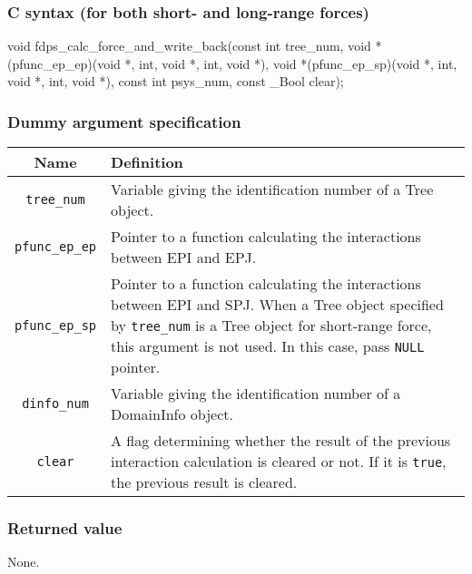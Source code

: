 \subsubsection*{C syntax (for both short- and long-range forces)}
\begin{screen}
\begin{spverbatim}
void fdps_calc_force_and_write_back(const int tree_num,                                             
                                    void *(pfunc_ep_ep)(void *, int, void *, int, void *),          
                                    void *(pfunc_ep_sp)(void *, int, void *, int, void *),          
                                    const int psys_num,                                             
                                    const _Bool clear);
\end{spverbatim}
\end{screen}

\subsubsection*{Dummy argument specification}
\begin{table}[h]
\begin{tabularx}{\linewidth}{cX}
\toprule
\rowcolor{Snow2}
Name & Definition \\
\midrule
\verb|tree_num|    & Variable giving the identification number of a Tree object.\\
\verb|pfunc_ep_ep| & Pointer to a function calculating the interactions between EPI and EPJ.\\
\verb|pfunc_ep_sp| & Pointer to a function calculating the interactions between EPI and SPJ. When a Tree object specified by \verb|tree_num| is a Tree object for short-range force, this argument is not used. In this case, pass \texttt{NULL} pointer.\\
\verb|dinfo_num|   & Variable giving the identification number of a DomainInfo object.\\
\verb|clear|       & A flag determining whether the result of the previous interaction calculation is cleared or not. If it is \texttt{true}, the previous result is cleared.\\
\bottomrule
\end{tabularx}
\end{table}

\subsubsection*{Returned value}
None.


